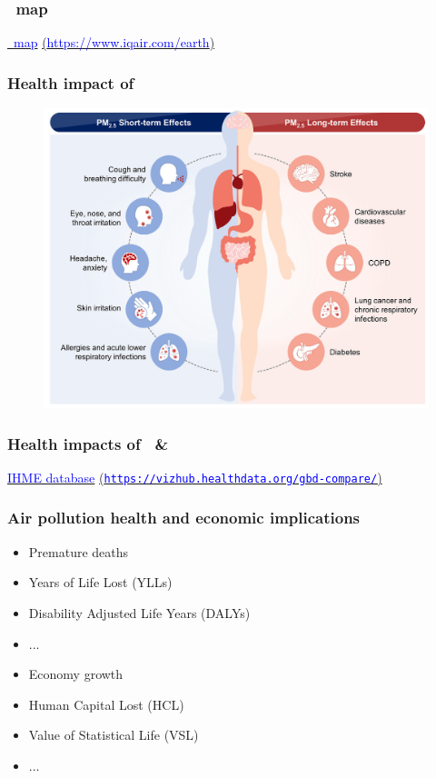 \begin{frame}
\frametitle{\pmm\ map}
\centering
\href{https://www.iqair.com/earth}{\textcolor{blue}{\pmm\ map}}
\href{https://www.iqair.com/earth}{(\textcolor{blue}{https://www.iqair.com/earth})}
\end{frame}

\begin{frame}
\frametitle{Health impact of \pmm}
\begin{figure}
    \includegraphics[width = 0.8\linewidth]{Images_intro/pm_impacts.png}
\end{figure}
\vfill \hfill \tiny{\cite{basith_impact_2022}}
\end{frame}

\begin{frame}
\frametitle{Health impacts of \pmm\ \& \oo}
\centering
\href{https://vizhub.healthdata.org/gbd-compare/}{\textcolor{blue}{IHME database}}
\href{https://vizhub.healthdata.org/gbd-compare/}{(\textcolor{blue}{\texttt{https://vizhub.healthdata.org/gbd-compare/}})}
\end{frame}


\begin{frame}
\frametitle{Air pollution health and economic implications}
\begin{itemize}
    \setlength\itemsep{0.3cm}
    \item Premature deaths
    \item Years of Life Lost (YLLs)
    \item Disability Adjusted Life Years (DALYs)
    \item ...
\end{itemize}
\vspace{0.35cm}
\begin{center}
\pause\text{\Large$ \Downarrow $}
\end{center}
\vspace{0.35cm}
\begin{itemize}
    \setlength\itemsep{0.3cm}
    \item Economy growth
    \item Human Capital Lost (HCL)
    \item Value of Statistical Life (VSL)
    \item ...
\end{itemize}
\end{frame}

